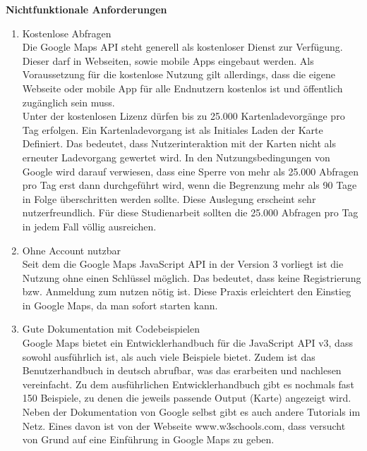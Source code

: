 \textbf{Nichtfunktionale Anforderungen}
\begin{enumerate}
\item Kostenlose Abfragen \\
Die Google Maps API steht generell als kostenloser Dienst zur Verfügung. Dieser darf in Webseiten, sowie mobile Apps eingebaut werden. Als Voraussetzung für die kostenlose Nutzung gilt allerdings, dass die eigene Webseite oder mobile App für alle Endnutzern kostenlos ist und öffentlich zugänglich sein muss.\\
Unter der kostenlosen Lizenz dürfen bis zu 25.000 Kartenladevorgänge pro Tag erfolgen. Ein Kartenladevorgang ist als Initiales Laden der Karte Definiert. Das bedeutet, dass Nutzerinteraktion mit der Karten nicht als erneuter Ladevorgang gewertet wird. 
In den Nutzungsbedingungen von Google wird darauf verwiesen, dass eine Sperre von mehr als 25.000 Abfragen pro Tag erst dann durchgeführt wird, wenn die Begrenzung mehr als 90 Tage in Folge überschritten werden sollte.
Diese Auslegung erscheint sehr nutzerfreundlich. Für diese Studienarbeit sollten die 25.000 Abfragen pro Tag in jedem Fall völlig ausreichen. \cite[Nutzungsbedingungen]{googlemaps}\cite[Lizenzierung]{googlemaps}


\item Ohne Account nutzbar\\
Seit dem die Google Maps JavaScript API in der Version 3 vorliegt ist die Nutzung ohne einen Schlüssel möglich. Das bedeutet, dass keine Registrierung bzw. Anmeldung zum nutzen nötig ist. Diese Praxis erleichtert den Einstieg in Google Maps, da man sofort starten kann. \cite{googlemapsblog}


\item Gute Dokumentation mit Codebeispielen\\
Google Maps bietet ein Entwicklerhandbuch für die JavaScript API v3, dass sowohl ausführlich ist, als auch viele Beispiele bietet. Zudem ist das Benutzerhandbuch in deutsch abrufbar, was das erarbeiten und nachlesen vereinfacht. 
Zu dem ausführlichen Entwicklerhandbuch gibt es nochmals fast 150 Beispiele, zu denen die jeweils passende Output (Karte) angezeigt wird.\cite[Documentation]{googlemaps} \\
Neben der Dokumentation von Google selbst gibt es auch andere Tutorials im Netz. Eines davon ist von der Webseite www.w3schools.com, dass versucht von Grund auf eine Einführung in Google Maps zu geben. 



\end{enumerate}


